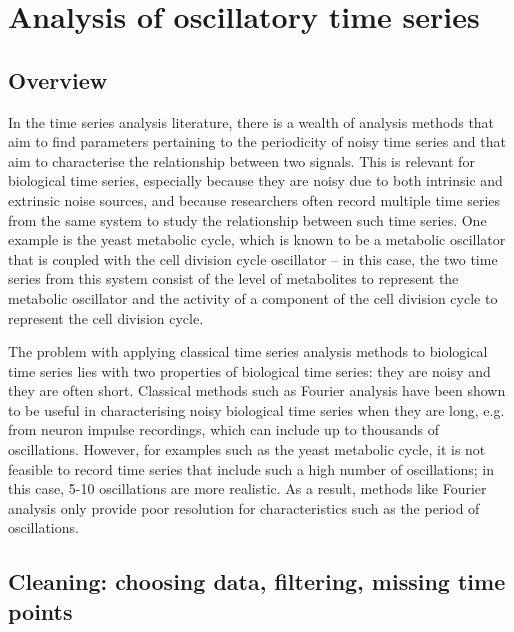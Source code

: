\chapter{Analysis of oscillatory time series}
\label{ch:analysis}

\section{Overview}
\label{sec:analysis-overview}


In the time series analysis literature, there is a wealth of analysis methods that aim to find parameters pertaining to the periodicity of noisy time series and that aim to characterise the relationship between two signals.
This is relevant for biological time series, especially because they are noisy due to both intrinsic and extrinsic noise sources, and because researchers often record multiple time series from the same system to study the relationship between such time series.
One example is the yeast metabolic cycle, which is known to be a metabolic oscillator that is coupled with the cell division cycle oscillator -- in this case, the two time series from this system consist of the level of metabolites to represent the metabolic oscillator and the activity of a component of the cell division cycle to represent the cell division cycle.

The problem with applying classical time series analysis methods to biological time series lies with two properties of biological time series: they are noisy and they are often short.
Classical methods such as Fourier analysis have been shown to be useful in characterising noisy biological time series when they are long, e.g. from neuron impulse recordings, which can include up to thousands of oscillations.
However, for examples such as the yeast metabolic cycle, it is not feasible to record time series that include such a high number of oscillations; in this case, 5-10 oscillations are more realistic.
As a result, methods like Fourier analysis only provide poor resolution for characteristics such as the period of oscillations.

\section{Cleaning: choosing data, filtering, missing time points}
\label{sec:analysis-cleaning}

